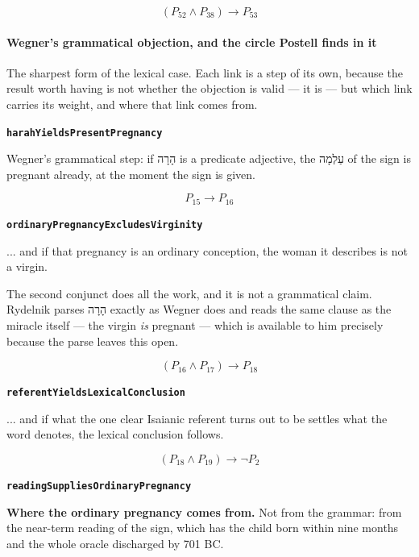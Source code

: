\documentclass[11pt]{article}
\begin{document}
\[(P_{52} \land P_{38}) \rightarrow P_{53}\]
\paragraph*{Wegner's grammatical objection, and the circle Postell finds in it}
\leavevmode\par
The sharpest form of the lexical case. Each link is a step of its own, because the result worth having is not whether the objection is valid — it is — but which link carries its weight, and where that link comes from.

\par\medskip\noindent\textbf{\texttt{harah\allowbreak{}Yields\allowbreak{}Present\allowbreak{}Pregnancy}}\par\nobreak\noindent
Wegner's grammatical step: if הָרָה is a predicate adjective, the עַלְמָה of the sign is pregnant already, at the moment the sign is given.

\[P_{15} \rightarrow P_{16}\]
\par\medskip\noindent\textbf{\texttt{ordinary\allowbreak{}Pregnancy\allowbreak{}Excludes\allowbreak{}Virginity}}\par\nobreak\noindent
... and if that pregnancy is an ordinary conception, the woman it describes is not a virgin.

The second conjunct does all the work, and it is not a grammatical claim. Rydelnik parses הָרָה exactly as Wegner does and reads the same clause as the miracle itself — the virgin \emph{is} pregnant — which is available to him precisely because the parse leaves this open.

\[(P_{16} \land P_{17}) \rightarrow P_{18}\]
\par\medskip\noindent\textbf{\texttt{referent\allowbreak{}Yields\allowbreak{}Lexical\allowbreak{}Conclusion}}\par\nobreak\noindent
... and if what the one clear Isaianic referent turns out to be settles what the word denotes, the lexical conclusion follows.

\[(P_{18} \land P_{19}) \rightarrow \lnot P_{2}\]
\par\medskip\noindent\textbf{\texttt{reading\allowbreak{}Supplies\allowbreak{}Ordinary\allowbreak{}Pregnancy}}\par\nobreak\noindent
\textbf{Where the ordinary pregnancy comes from.} Not from the grammar: from the near-term reading of the sign, which has the child born within nine months and the whole oracle discharged by 701 BC.
\end{document}
